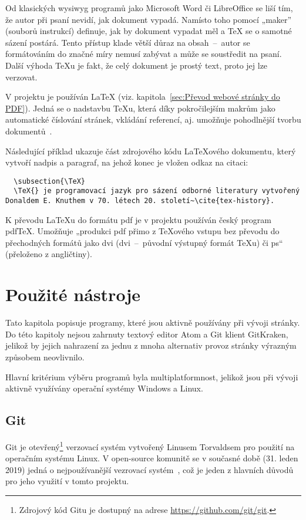 \documentclass[a4paper, 12pt]{article}
\newcommand*{\fullref}[1]{\hyperref[{#1}]{\ref*{#1}}}
\begin{document}
  Od klasických \gls{wysiwyg} programů jako Microsoft Word či LibreOffice se liší tím, že autor při psaní nevidí, jak dokument vypadá. Namísto toho pomocí „maker” (souborů instrukcí) definuje, jak by dokument vypadat měl a \TeX{} se o samotné sázení postárá. Tento přístup klade větší důraz na obsah~--~autor se formátováním do značné míry nemusí zabývat a může se soustředit na psaní. Další výhoda \TeX u je fakt, že celý dokument je prostý text, proto jej lze verzovat.

  V projektu je používán \LaTeX{} (viz. kapitola~\fullref{sec:Převod webové stránky do PDF}). Jedná se o nadstavbu \TeX u, která díky pokročilejším makrům jako automatické číslování stránek, vkládání referencí, aj. umožňuje pohodlnější tvorbu dokumentů~\cite{getting-started-with-latex}.

  Následující příklad ukazuje část zdrojového kódu \LaTeX ového dokumentu, který vytvoří nadpis a paragraf, na jehož konec je vložen odkaz na citaci:

  \begin{verbatim}
  \subsection{\TeX}
  \TeX{} je programovací jazyk pro sázení odborné literatury vytvořený Donaldem E. Knuthem v 70. létech 20. století~\cite{tex-history}.
  \end{verbatim}

  K převodu \LaTeX u do formátu \gls{pdf} je v projektu používán český program pdf\TeX. Umožňuje „produkci \gls{pdf} přimo z \TeX ového vstupu bez převodu do přechodných formátů jako \acrshort{dvi} (\acrlong{dvi}~--~původní výstupný formát \TeX u) či \gls{ps}“~\cite{pdftex} (přeloženo z angličtiny).


  \section{Použité nástroje} \label{sec:Použité nástroje}
  Tato kapitola popisuje programy, které jsou aktivně používány při vývoji stránky. Do této kapitoly nejsou zahrnuty textový editor Atom a Git klient GitKraken, jelikož by jejich nahrazení za jednu z mnoha alternativ provoz stránky výrazným způsobem neovlivnilo.

  Hlavní kritérium výběru programů byla multiplatformnost, jelikož jsou při vývoji aktivně využívány operační systémy Windows a Linux.


  \subsection{Git} \label{sec:Git}
  Git je otevřený\footnote{Zdrojový kód Gitu je dostupný na adrese \url{https://github.com/git/git}.} verzovací systém vytvořený Linusem Torvaldsem pro použití na operačním systému Linux. V open-source komunitě se v současné době (31. leden 2019) jedná o nejpoužívanější vezrovací systém~\cite{version-control-usage-statistics}, což je jeden z hlavních důvodů pro jeho využití v tomto projektu.
\end{document}
